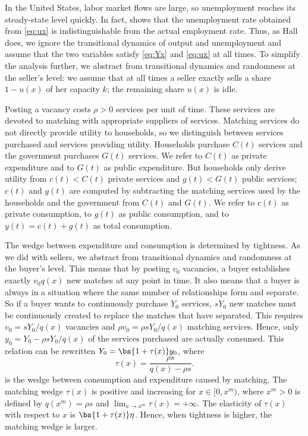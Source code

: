 \documentclass[letterpaper,12pt,leqno]{article}
\begin{document}
\begin{bibunit}
In the United States, labor market flows are large, so unemployment reaches its steady-state level quickly. In fact,  shows that the unemployment rate obtained from \eqref{eq:ux} is indistinguishable from the actual employment rate. Thus, as Hall does, we ignore the transitional dynamics of output and unemployment and assume that the two variables satisfy \eqref{eq:Yx} and \eqref{eq:ux} at all times. To simplify the analysis further, we abstract from transitional dynamics and randomness at the seller's level: we assume that at all times a seller exactly sells a share $1-u(x)$ of her capacity $k$; the remaining share $u(x)$ is idle.

Posting a vacancy costs $\rho>0$ services per unit of time. These services are devoted to matching with appropriate suppliers of services. Matching services do not directly provide utility to households, so we distinguish between services purchased and services providing utility. Households purchase $C(t)$ services and the government purchases $G(t)$ services. We refer to $C(t)$ as private expenditure and to $G(t)$ as public expenditure. But households only derive utility from $c(t)<C(t)$ private services and $g(t)<G(t)$ public services; $c(t)$ and $g(t)$ are computed by subtracting the matching services used by the households and the government from $C(t)$ and $G(t)$. We refer to $c(t)$ as private consumption, to $g(t)$ as public consumption, and to $y(t)=c(t)+g(t)$ as total consumption.

The wedge between expenditure and consumption is determined by tightness. As we did with sellers, we abstract from transitional dynamics and randomness at the buyer's level. This means that by posting $v_0$ vacancies, a buyer establishes exactly $v_0  q(x)$ new matches at any point in time.  It also means that a buyer is always in a situation where the same number of relationships form and separate. So if a buyer wants to continuously purchase $Y_0$ services, $s  Y_0$ new matches must be continuously created to replace the matches that have separated. This requires $v_0 = s   Y_0/q(x)$ vacancies and $\rho  v_0 = \rho  s   Y_0/q(x)$ matching services. Hence, only $y_0 = Y_0  - \rho   s Y_0 /q(x)$ of the services purchased are actually consumed. This relation can be rewritten $Y_0 = \bs{1+\tau(x)} y_0$, where 
\begin{equation}
\tau(x) = \frac{\rho  s}{q(x)-\rho  s}.
\label{eq:taux}\end{equation}
is the wedge between consumption and expenditure caused by matching. The matching wedge $\tau(x)$ is positive and increasing for $x\in[0,x^{m})$, where $x^{m}>0$ is defined by $q(x^{m})=\rho  s$ and $\lim_{x\to x^{m}}\tau(x)=+\infty$. The elasticity of $\tau(x)$ with respect to $x$ is $\bs{1+\tau(x)} \eta$. Hence, when tightness is higher, the matching wedge is larger.


\end{bibunit}
\end{document}
